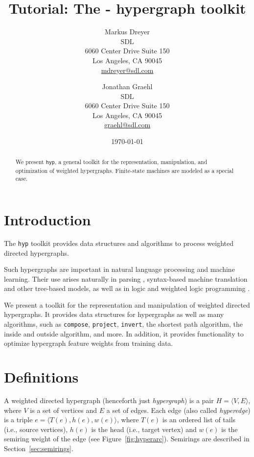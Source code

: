 \documentclass[12pt]{article}
\title{Tutorial: The \hyp{} hypergraph toolkit}
\author{
  Markus Dreyer\\
  SDL\\
  6060 Center Drive Suite 150\\
  Los Angeles, CA 90045\\
  \url{mdreyer@sdl.com}
  \and
  Jonathan Graehl\\
  SDL\\
  6060 Center Drive Suite 150\\
  Los Angeles, CA 90045\\
  \url{graehl@sdl.com}
}
\date{\today}
\newcommand{\hyp}{\texttt{hyp}\xspace}
\newcommand{\code}[1]{\texttt{#1}}
\newcommand{\secref}[1]{Section~\ref{sec:#1}}
\newcommand{\figref}[1]{Figure~\ref{fig:#1}}
\let\cite\citep    %
\begin{document}
\maketitle

\begin{abstract}
  We present \hyp, a general toolkit for the representation,
  manipulation, and optimization of weighted hypergraphs. Finite-state
  machines are modeled as a special case.
\end{abstract}

\tableofcontents

\section{Introduction}

The \hyp{} toolkit provides data structures and algorithms to process
weighted directed hypergraphs.

Such hypergraphs are important in natural language processing and
machine learning. Their use arises naturally in parsing
\cite{klein_parsing_2005, huang_better_2005}, syntax-based machine
translation and other tree-based models, as well as in logic
\cite{gallo_directed_1993} and weighted logic programming
\cite{eisner_dyna:_2011}.

We present a toolkit for the representation and manipulation of
weighted directed hypergraphs. It provides data structures for
hypergraphs as well as many algorithms, such as \code{compose},
\code{project}, \code{invert}, the shortest path algorithm, the inside
and outside algorithm, and more. In addition, it provides
functionality to optimize hypergraph feature weights from training
data.

\section{Definitions}\label{sec:definitions}
A weighted directed hypergraph (henceforth just \textit{hypergraph})
is a pair $H=\langle V,E\rangle$, where $V$ is a set of vertices and
$E$ a set of edges. Each edge (also called \textit{hyperedge}) is a
triple $e=\langle T(e), h(e), w(e) \rangle$, where $T(e)$ is an
ordered list of tails (i.e., source vertices), $h(e)$ is the head
(i.e., target vertex) and $w(e)$ is the semiring weight of the edge
(see \figref{hyperarc}). Semirings are described in
\secref{semirings}.
\end{document}
